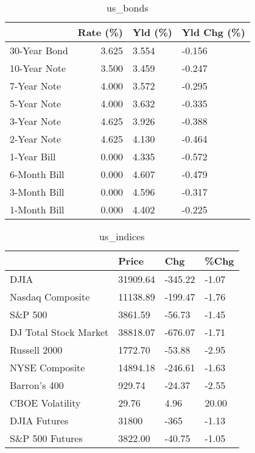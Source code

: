 \documentclass{article}%
\begin{document}
%


\begin{table}[htbp]%
\caption{us\_bonds}%
\centering%
\begin{adjustbox}{width=1\textwidth}%
\begin{tabular}{lrll}
\toprule
             &  Rate (\%) & Yld (\%) & Yld Chg (\%) \\
\midrule
30-Year Bond &     3.625 &   3.554 &      -0.156 \\
10-Year Note &     3.500 &   3.459 &      -0.247 \\
 7-Year Note &     4.000 &   3.572 &      -0.295 \\
 5-Year Note &     4.000 &   3.632 &      -0.335 \\
 3-Year Note &     4.625 &   3.926 &      -0.388 \\
 2-Year Note &     4.625 &   4.130 &      -0.464 \\
 1-Year Bill &     0.000 &   4.335 &      -0.572 \\
6-Month Bill &     0.000 &   4.607 &      -0.479 \\
3-Month Bill &     0.000 &   4.596 &      -0.317 \\
1-Month Bill &     0.000 &   4.402 &      -0.225 \\
\bottomrule
\end{tabular}
%
\end{adjustbox}%
\end{table}

%


\begin{table}[htbp]%
\caption{us\_indices}%
\centering%
\begin{adjustbox}{width=1\textwidth}%
\begin{tabular}{llll}
\toprule
                      &    Price &     Chg &  \%Chg \\
\midrule
                 DJIA & 31909.64 & -345.22 & -1.07 \\
     Nasdaq Composite & 11138.89 & -199.47 & -1.76 \\
              S\&P 500 &  3861.59 &  -56.73 & -1.45 \\
DJ Total Stock Market & 38818.07 & -676.07 & -1.71 \\
         Russell 2000 &  1772.70 &  -53.88 & -2.95 \\
       NYSE Composite & 14894.18 & -246.61 & -1.63 \\
         Barron's 400 &   929.74 &  -24.37 & -2.55 \\
      CBOE Volatility &    29.76 &    4.96 & 20.00 \\
         DJIA Futures &    31800 &    -365 & -1.13 \\
      S\&P 500 Futures &  3822.00 &  -40.75 & -1.05 \\
\bottomrule
\end{tabular}
%
\end{adjustbox}%
\end{table}
\end{document}
